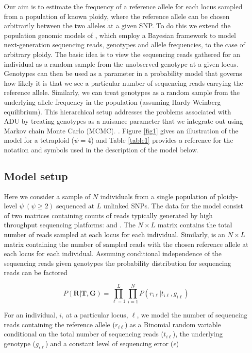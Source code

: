 \documentclass[11pt,english,letterpaper,oneside]{article}
\begin{document}
\noindent Our aim is to estimate the frequency of a reference allele for each locus sampled from a population of known ploidy, where the reference allele can be chosen arbitrarily between the two alleles at a given SNP. To do this we extend the population genomic models of \cite{buerkle2013popModels}, which employ a Bayesian framework to model next-generation sequencing reads, genotypes and allele frequencies, to the case of arbitrary ploidy. The basic idea is to view the sequencing reads gathered for an individual as a random sample from the unobserved genotype at a given locus. Genotypes can then be used as a parameter in a probability model that governs how likely it is that we see a particular number of sequencing reads carrying the reference allele. Similarly, we can treat genotypes as a random sample from the underlying allele frequency in the population (assuming Hardy-Weinberg equilibrium). This hierarchical setup addresses the problems associated with ADU by treating genotypes as a nuisance parameter that we integrate out using Markov chain Monte Carlo (MCMC). . Figure \ref{fig1} gives an illustration of the model for a tetraploid ($\psi=4$) and Table \ref{table1} provides a reference for the notation and symbols used in the description of the model below.

\medskip
\subsection*{Model setup}
\medskip

Here we consider a sample of $N$ individuals from a single population of ploidy-level $\psi\: (\psi\geq2)$ sequenced at $L$ unlinked SNPs. The data for the model consist of two matrices containing counts of reads typically generated by high throughput sequencing platforms: \tmat{} and \rmat. The $N\times L$ matrix \tmat{} contains the total number of reads sampled at each locus for each individual. Similarly, \rmat{} is an $N\times L$ matrix containing the number of sampled reads with the chosen reference allele at each locus for each individual. Assuming conditional independence of the sequencing reads given genotypes the probability distribution for sequencing reads can be factored

\begin{equation}\label{factored_lik}
P(\bm{R}|\bm{T},\bm{G}) = \displaystyle\prod_{\ell=1}^L\displaystyle\prod_{i=1}^N P(r_{i \ell}|t_{i \ell},g_{i \ell})
\end{equation}

\noindent For an individual, $i$, at a particular locus, $\ell$, we model the number of sequencing reads containing the reference allele ($r_{i\ell}$) as a Binomial random variable conditional on the total number of sequencing reads ($t_{i\ell} $), the underlying genotype ($g_{i\ell}$) and a constant level of sequencing error ($\epsilon$)
\end{document}
